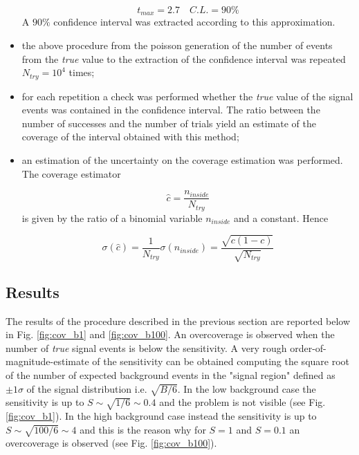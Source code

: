 \documentclass[10pt, oneside]{article}   	%
\begin{document}
\begin{itemize}
$$ t_{max} = 2.7 \quad C.L. = 90\% $$
A $90 \%$ confidence interval was extracted according to this approximation.
\item the above procedure from the poisson generation of the number of events from the \textit{true} value to the extraction of the confidence interval was repeated $N_{try} = 10^4$ times;
\item for each repetition a check was performed whether the \textit{true} value of the signal events was contained in the confidence interval. The ratio between the number of successes and the number of trials yield an estimate of the coverage of the interval obtained with this method;
\item an estimation of the uncertainty on the coverage estimation was performed. The coverage estimator 

$$ \hat{c} = \frac{n_{inside}}{N_{try}}$$
is given by the ratio of a binomial variable $n_{inside}$ and a constant. Hence

$$ \sigma(\hat{c}) = \frac{1}{N_{try}} \sigma(n_{inside}) = \frac{\sqrt{c(1-c)}}{\sqrt{N_{try}}}$$
\end{itemize}
\subsection{Results}

The results of the procedure described in the previous section are reported below in Fig. \ref{fig:cov_b1} and \ref{fig:cov_b100}. An overcoverage is observed when the number of \textit{true} signal events is below the sensitivity. A very rough order-of-magnitude-estimate of the sensitivity can be obtained computing the square root of the number of expected background events in the "signal region" defined as $\pm 1 \sigma$ of the signal distribution i.e. $\sqrt{B / 6}$. In the low background case the sensitivity is up to $S \sim \sqrt{1/6} \sim 0.4$ and the problem is not visible (see Fig. \ref{fig:cov_b1}). In the high background case instead the sensitivity is up to $S \sim \sqrt{100/6} \sim 4$ and this is the reason why for $S = 1$ and $S=0.1$ an overcoverage is observed (see Fig. \ref{fig:cov_b100}). 
\end{document}
